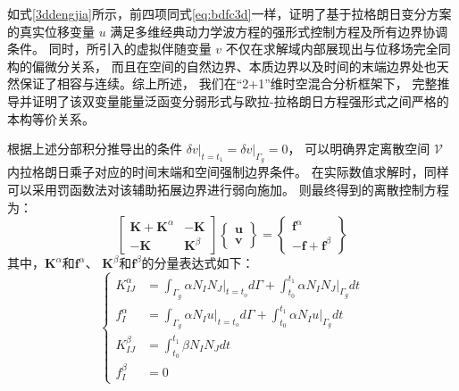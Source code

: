 如式\eqref{3ddengjia}所示，前四项同式\eqref{eq:bdfc3d}一样，证明了基于拉格朗日变分方案的真实位移变量 $u$ 满足多维经典动力学波方程的强形式控制方程及所有边界协调条件。
同时，所引入的虚拟伴随变量 $v$ 不仅在求解域内部展现出与位移场完全同构的偏微分关系，
而且在空间的自然边界、本质边界以及时间的末端边界处也天然保证了相容与连续。综上所述，
我们在“2+1”维时空混合分析框架下，
完整推导并证明了该双变量能量泛函变分弱形式与欧拉-拉格朗日方程强形式之间严格的本构等价关系。

根据上述分部积分推导出的条件 $\delta v \vert_{t=t_1} = \delta v \vert_{\Gamma_g} = 0$，
可以明确界定离散空间 $\mathcal{V}$ 内拉格朗日乘子对应的时间末端和空间强制边界条件。
在实际数值求解时，同样可以采用罚函数法对该辅助拓展边界进行弱向施加。
则最终得到的离散控制方程为：
\begin{equation}\label{3d_kdf}
\begin{bmatrix}
\boldsymbol K + \boldsymbol K^\alpha & -\boldsymbol K \\ -\boldsymbol K & \boldsymbol K^\beta
\end{bmatrix}
\begin{Bmatrix}
\boldsymbol u \\ \boldsymbol v
\end{Bmatrix} =
\begin{Bmatrix}
 \boldsymbol f^\alpha \\ -\boldsymbol f + \boldsymbol f^\beta
\end{Bmatrix}
\end{equation}
其中，$\boldsymbol K^\alpha$和$\boldsymbol f^\alpha$、
$\boldsymbol K^\beta$和$\boldsymbol f^\beta$的分量表达式如下：
\begin{equation}\label{3d^ab}
    \left \{
        \begin{aligned}
            K^\alpha_{IJ} &= \int_{\Gamma_g} \alpha N_I N_J \vert_{t=t_o} d\Gamma + \int_{t_0}^{t_1} \alpha N_I N_J \vert_{\Gamma_g} dt \\
            f^\alpha_{I}  &= \int_{\Gamma_g} \alpha N_I u \vert_{t=t_o} d\Gamma + \int_{t_0}^{t_1} \alpha N_I u \vert_{\Gamma_g} dt\\
            K^\beta_{IJ} &= \int_{t_0}^{t_1} \beta N_I N_J dt \\ 
            f^\beta_I &= 0
        \end{aligned}
    \right .
\end{equation}












